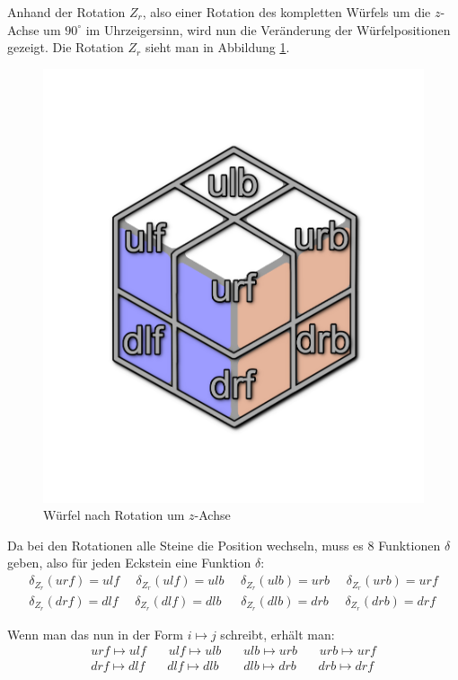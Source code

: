 \documentclass[12pt,a4paper, usenames, dvipsnames]{article}
\begin{document}
Anhand der Rotation $Z_r$, also einer Rotation des kompletten Würfels um die $z$-Achse um $90^\circ$ im Uhrzeigersinn, wird nun die Veränderung der Würfelpositionen gezeigt. Die Rotation $Z_r$ sieht man in Abbildung \ref{16}.
\begin{figure}[h]
\centering
\includegraphics[scale=0.13]{auf_ulf.png}
\caption{Würfel nach Rotation um $z$-Achse}
\label{16}
\end{figure}
Da bei den Rotationen alle Steine die Position wechseln, muss es 8 Funktionen $\delta$ geben, also für jeden Eckstein eine Funktion $\delta$:
\begin{align*}
\delta_{Z_r}(urf) = ulf \ \ \ \ \ \ \delta_{Z_r}(ulf) = ulb \ \ \ \ \ \ \delta_{Z_r}(ulb) = urb \ \ \ \ \ \ \delta_{Z_r}(urb) = urf \\
\delta_{Z_r}(drf) = dlf \ \ \ \ \ \ \delta_{Z_r}(dlf) = dlb \ \ \ \ \ \ \ \delta_{Z_r}(dlb) = drb \ \ \ \ \ \ \delta_{Z_r}(drb) = drf
\end{align*}

Wenn man das nun in der Form $i \mapsto j$ schreibt, erhält man: 
\begin{align*}
urf \mapsto ulf \ \ \ \ \ \ \ \ ulf \mapsto ulb \ \ \ \ \ \ \ \ ulb \mapsto urb \ \ \ \ \ \ \ \ urb \mapsto urf \\
drf \mapsto dlf \ \ \ \ \ \ \ \ dlf \mapsto dlb \ \ \ \ \ \ \ \ \ dlb \mapsto drb \ \ \ \ \ \ \ \ drb \mapsto drf
\end{align*}
\end{document}
